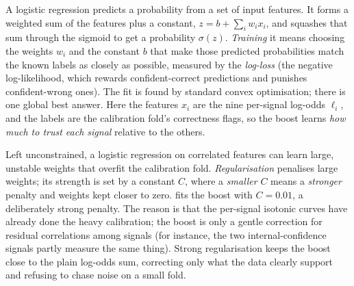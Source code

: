 \begin{intuition}
A logistic regression predicts a probability from a set of input features. It forms a
weighted sum of the features plus a constant, $z = b + \sum_i w_i x_i$, and squashes
that sum through the sigmoid to get a probability $\sigma(z)$. \emph{Training} it
means choosing the weights $w_i$ and the constant $b$ that make those predicted
probabilities match the known labels as closely as possible, measured by the
\emph{log-loss} (the negative log-likelihood, which rewards confident-correct
predictions and punishes confident-wrong ones). The fit is found by standard convex
optimisation; there is one global best answer. Here the features $x_i$ are the nine
per-signal log-odds $\ell_i$, and the labels are the calibration fold's correctness
flags, so the boost learns \emph{how much to trust each signal} relative to the
others.
\end{intuition}

\begin{precise}
Left unconstrained, a logistic regression on correlated features can learn large,
unstable weights that overfit the calibration fold. \emph{Regularisation} penalises
large weights; its strength is set by a constant $C$, where a \emph{smaller} $C$ means
a \emph{stronger} penalty and weights kept closer to zero. \caem{} fits the boost with
$C = 0.01$, a deliberately strong penalty. The reason is that the per-signal isotonic
curves have already done the heavy calibration; the boost is only a gentle correction
for residual correlations among signals (for instance, the two internal-confidence
signals partly measure the same thing). Strong regularisation keeps the boost close to
the plain log-odds sum, correcting only what the data clearly support and refusing to
chase noise on a small fold.
\end{precise}

